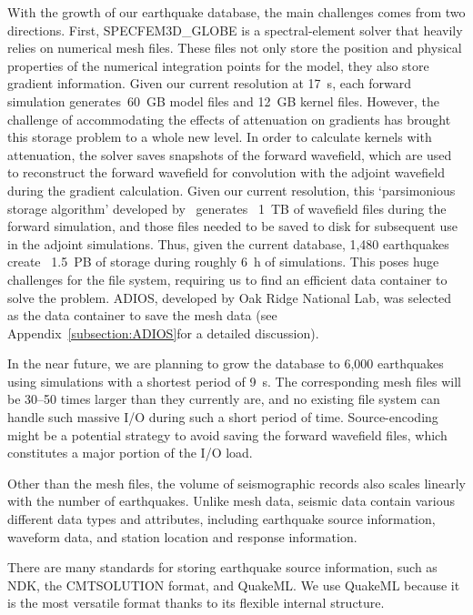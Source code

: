With the growth of our earthquake database, the main challenges comes from two directions.
First, SPECFEM3D\_GLOBE is a spectral-element solver that heavily
relies on numerical mesh files.
These files not only store
the position and physical properties of the numerical integration points for the model,
they also store gradient information.
Given our current resolution at 17~s,
each forward simulation generates~60~GB model
files and 12~GB kernel files.
However, the challenge of accommodating the effects of attenuation on gradients has brought this
storage problem to a whole new level.
In order to calculate kernels with attenuation,
the solver saves snapshots of the forward wavefield,
which are used to reconstruct the forward wavefield for convolution with the adjoint wavefield during the gradient calculation.
Given our current resolution,
this `parsimonious storage algorithm' developed by~\cite{KoXiBoPeSaLiTr16} generates ~1~TB of wavefield files during the forward simulation, and those
files needed to be saved to disk for subsequent use in the adjoint simulations.
Thus, given the current database,
1,480 earthquakes create ~1.5~PB of storage during roughly 6~h of simulations.
This poses huge challenges for the file system,
requiring us to find an efficient data container to solve the problem.
ADIOS, developed by Oak Ridge
National Lab, was selected as the data container to save the mesh data
(see Appendix~\ref{subsection:ADIOS}for a detailed discussion).

In the near future, we are
planning to grow the database to 6,000 earthquakes using simulations with a
shortest period of 9~s.
The corresponding mesh files will be 30--50 times larger than they currently are,
and no existing file system can handle such massive I/O during such a short period of time.
Source-encoding might be a potential strategy to avoid saving the forward
wavefield files, which constitutes a major portion of the I/O load.

Other than the mesh files,
the volume of seismographic records also scales linearly with the number
of earthquakes.
Unlike mesh data, seismic data contain various different
data types and attributes,
including earthquake source information, waveform data, and station location and response information.

There are many standards for storing earthquake source information,
such as NDK, the CMTSOLUTION format, and QuakeML.
We use QuakeML because it is the most versatile format thanks to its flexible
internal structure.

